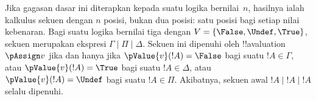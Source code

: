 \documentclass[../../../include/open-logic-section]{subfiles}
\begin{document}
Jika gagasan dasar ini diterapkan kepada suatu logika bernilai~$n$, hasilnya
ialah kalkulus sekuen dengan $n$ posisi, bukan dua posisi: satu posisi bagi
setiap nilai kebenaran. Bagi suatu logika bernilai tiga dengan
$V=\{\False,\Undef,\True\}$, sekuen merupakan ekspresi
$\Gamma\mid\Pi\mid\Delta$. Sekuen ini dipenuhi oleh
!!a{valuation}~$\pAssign v$ jika dan hanya jika
$\pValue{v}(!A)=\False$ bagi suatu $!A\in\Gamma$, atau
$\pValue{v}(!A)=\True$ bagi suatu $!A\in\Delta$, atau
$\pValue{v}(!A)=\Undef$ bagi suatu $!A\in\Pi$. Akibatnya, sekuen awal
$!A\mid !A\mid !A$ selalu dipenuhi.
\end{document}
